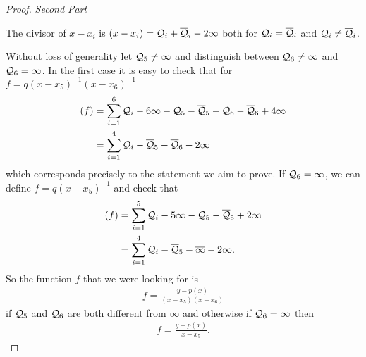 \documentclass[english,11pt,a4paper]{article}
\begin{document}
\begin{proof}
\newpage
  \textit{Second Part}

  The divisor of $x - x_i$ is $(x - x_i) = \mathcal{Q}_i + \overline {\mathcal{Q}}_i -2 \infty$ both for $\mathcal{Q}_i = \overline {\mathcal{Q}}_i$ and $\mathcal{Q}_i \neq \overline {\mathcal{Q}}_i$.

  Without loss of generality let $\mathcal{Q}_5 \neq \infty$ and distinguish between $\mathcal{Q}_6 \neq \infty$ and $\mathcal{Q}_6 = \infty$. In the first case it is easy to check that for $f = q (x - x_5)^{-1}(x - x_6)^{-1}$%
  \begin{align*}
    (f) &= \sum_{i=1}^6 \mathcal{Q}_i - 6 \infty - \mathcal{Q}_5 - \overline {\mathcal{Q}}_5 - \mathcal{Q}_6 - \overline {\mathcal{Q}}_6 + 4 \infty \\
        &= \sum_{i=1}^4 \mathcal{Q}_i- \overline {\mathcal{Q}}_5 - \overline {\mathcal{Q}}_6 - 2 \infty
  \end{align*}
  which corresponds precisely to the statement we aim to prove. If $\mathcal{Q}_6 = \infty$, we can define $f = q (x - x_5)^{-1}$ and check that
  \begin{align*}
    (f) &= \sum_{i=1}^5 \mathcal{Q}_i - 5 \infty - \mathcal{Q}_5 - \overline {\mathcal{Q}}_5 + 2 \infty \\
        &= \sum_{i=1}^4 \mathcal{Q}_i - \overline {\mathcal{Q}}_5 - \overline \infty - 2 \infty.
  \end{align*}
  So the function $f$ that we were looking for is
  \begin{align*}
    f = \frac{y-p(x)}{(x-x_5)(x-x_6)}
  \end{align*}
  if $\mathcal{Q}_5$ and $\mathcal{Q}_6$ are both different from $\infty$ and otherwise if $\mathcal{Q}_6 = \infty$ then
  \begin{align*}
    f = \frac{y-p(x)}{x-x_5}.
  \end{align*}
\end{proof}
\end{document}
